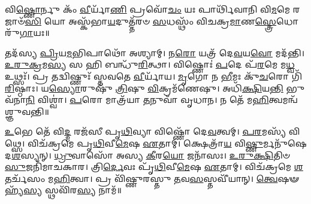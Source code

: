 


𑌵𑌿\-\ul{𑌷𑍍𑌣𑍋}\-𑌰𑍍𑌨𑍁 𑌕𑌂᳴ \ul{𑌵𑍀}\-𑌰𑍍𑌯𑌾᳴\-\ul{𑌣𑌿} 𑌪𑍍𑌰𑌵𑍋᳴\-\ul{𑌚𑌂} 𑌯𑌃 𑌪𑌾𑌰𑍍𑌥𑌿᳴𑌵𑌾𑌨𑌿 𑌵𑌿\-\ul{𑌮}\-𑌮𑍇 𑌰𑌜𑌾𑍞᳴\-\ul{𑌸𑌿} 𑌯𑍋 𑌅𑌸𑍍𑌕᳴𑌭𑌾\-\ul{𑌯}\-𑌦𑍁𑌤𑍍𑌤᳴𑌰𑍞 \ul{𑌸}\-𑌧𑌸𑍍𑌥𑌂᳴ 𑌵𑌿𑌚𑌕𑍍𑌰\-\ul{𑌮𑌾}\-𑌣\-\ul{𑌸𑍍𑌤𑍍𑌰𑍇}\-𑌧𑍋𑌰𑍁᳴\-\ul{𑌗𑌾}\-𑌯𑌃॥ 

𑌤𑌦᳴𑌸𑍍𑌯 \ul{𑌪𑍍𑌰𑌿}\-𑌯\-\ul{𑌮}\-𑌭𑌿𑌪𑌾𑌥𑍋᳴ 𑌅𑌶𑍍𑌯𑌾𑌮𑍍। 𑌨\-\ul{𑌰𑍋} 𑌯𑌤𑍍𑌰᳴ 𑌦𑍇\-\ul{𑌵}\-𑌯\-\ul{𑌵𑍋} 𑌮𑌦᳴𑌨𑍍𑌤𑌿। \ul{𑌉}\-\-\ul{𑌰𑍁}\-\-\ul{𑌕𑍍𑌰}\-𑌮\-\ul{𑌸𑍍𑌯} 𑌸 𑌹𑌿 𑌬𑌨𑍍𑌧𑍁᳴\-\ul{𑌰𑌿}\-𑌤𑍍𑌥𑌾। 𑌵𑌿𑌷𑍍𑌣𑍋𑌃॑ \ul{𑌪}\-𑌦𑍇 𑌪᳴\-\ul{𑌰}\-𑌮𑍇 𑌮\-\ul{𑌧𑍍𑌵} 𑌉𑌥𑍍𑌸𑌃᳴। 𑌪𑍍𑌰 𑌤𑌦𑍍𑌵𑌿𑌷𑍍𑌣𑍁𑌃᳴  𑌸𑍍𑌤𑌵𑌤𑍇 \ul{𑌵𑍀}\-𑌰𑍍𑌯𑌾᳴𑌯। \ul{𑌮𑍃}\-𑌗𑍋 𑌨 \ul{𑌭𑍀}\-𑌮𑌃 𑌕𑍁᳴\-\ul{𑌚}\-𑌰𑍋 𑌗𑌿᳴\-\ul{𑌰𑌿}\-𑌷𑍍𑌠𑌾𑌃। 𑌯\-\ul{𑌸𑍍𑌯𑍋}\-𑌰𑍁𑌷𑍁᳴ \ul{𑌤𑍍𑌰𑌿}\-𑌷𑍁 \ul{𑌵𑌿}\-𑌕𑍍𑌰𑌮᳴𑌣𑍇𑌷𑍁। 𑌅𑌧𑌿᳴\-\ul{𑌕𑍍𑌷𑌿}\-𑌯\-\ul{𑌨𑍍𑌤𑌿} 𑌭𑍁𑌵᳴𑌨𑌾\-\ul{𑌨𑌿} 𑌵𑌿𑌶𑍍𑌵𑌾॑। \ul{𑌪}\-𑌰𑍋 𑌮𑌾𑌤𑍍𑌰᳴𑌯𑌾 \ul{𑌤}\-𑌨𑍁𑌵𑌾᳴ 𑌵𑍃𑌧𑌾𑌨। 𑌨 𑌤𑍇᳴ 𑌮\-\ul{𑌹𑌿}\-𑌤𑍍𑌵𑌮𑌨𑍍𑌵᳴𑌶𑍍𑌞𑍁𑌵𑌨𑍍𑌤𑌿॥ 

\-\ul{𑌉}\-𑌭𑍇 𑌤𑍇᳴ 𑌵𑌿\-\ul{𑌦𑍍𑌮} 𑌰𑌜᳴𑌸𑍀 𑌪𑍃\-\ul{𑌥𑌿}\-𑌵𑍍𑌯𑌾 𑌵𑌿𑌷𑍍𑌣𑍋᳴ 𑌦𑍇\-\ul{𑌵}\-𑌤𑍍𑌵𑌮𑍍। \ul{𑌪}\-\-\ul{𑌰}\-𑌮𑌸𑍍𑌯᳴ 𑌵𑌿𑌥𑍍𑌸𑍇। 𑌵𑌿𑌚᳴𑌕𑍍𑌰𑌮𑍇 𑌪𑍃\-\ul{𑌥𑌿}\-𑌵𑍀\-\ul{𑌮𑍇}\-𑌷 \ul{𑌏}\-𑌤𑌾𑌮𑍍। 𑌕𑍍𑌷𑍇𑌤𑍍𑌰𑌾᳴\-\ul{𑌯} 𑌵𑌿\-\ul{𑌷𑍍𑌣𑍁}\-𑌰𑍍𑌮𑌨𑍁᳴𑌷𑍇 𑌦\-\ul{𑌶}\-𑌸𑍍𑌯𑌨𑍍। \ul{𑌧𑍍𑌰𑍁}\-𑌵𑌾𑌸𑍋᳴ 𑌅𑌸𑍍𑌯 \ul{𑌕𑍀}\-𑌰\-\ul{𑌯𑍋} 𑌜𑌨𑌾᳴𑌸𑌃। \ul{𑌉}\-\-\ul{𑌰𑍁}\-\-\ul{𑌕𑍍𑌷𑌿}\-𑌤𑌿𑍞 \ul{𑌸𑍁}\-𑌜𑌨𑌿᳴𑌮𑌾𑌚𑌕𑌾𑌰। 𑌤𑍍𑌰𑌿\-\ul{𑌰𑍍𑌦𑍇}\-𑌵𑌃 𑌪𑍃᳴\-\ul{𑌥𑌿}\-𑌵𑍀\-\ul{𑌮𑍇}\-𑌷 \ul{𑌏}\-𑌤𑌾𑌮𑍍। 𑌵𑌿𑌚᳴𑌕𑍍𑌰𑌮𑍇 \ul{𑌶}\-𑌤𑌰𑍍𑌚᳴𑌸𑌂 𑌮\-\ul{𑌹𑌿}\-𑌤𑍍𑌵𑌾। 𑌪𑍍𑌰 𑌵𑌿᳴𑌷𑍍𑌣𑍁𑌰𑌸𑍍𑌤𑍁 \ul{𑌤}\-𑌵\-\ul{𑌸}\-𑌸𑍍𑌤𑌵𑍀᳴𑌯𑌾𑌨𑍍। \ul{𑌤𑍍𑌵𑍇}\-𑌷𑍟𑌹𑍍𑌯᳴\-\ul{𑌸𑍍𑌯} 𑌸𑍍𑌥𑌵𑌿᳴𑌰\-\ul{𑌸𑍍𑌯} 𑌨𑌾𑌮᳴॥ 

